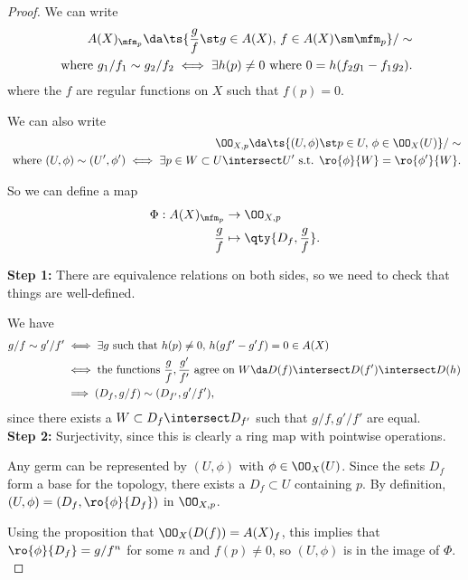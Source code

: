 \begin{proof}

We can write
\begin{align*}  
A(X)_{\mfm_p} \da \ts{{g\over f} \st g\in A(X),\, f\in A(X)\sm \mfm_p} / \sim \\
\text{ where } g_1/f_1 \sim g_2/f_2 \iff \exists h(p) \neq 0 \text{ where }0 = h(f_2 g_1 - f_1 g_2)
.\end{align*} where the \(f\) are regular functions on \(X\) such that
\(f(p) = 0\).

We can also write
\begin{align*}  
\OO_{X, p} \da \ts{(U, \phi) \st p\in U,\, \phi \in \OO_X(U) } /\sim 
\\ \text{ where } (U, \phi) \sim (U', \phi') 
\iff \exists p\in W \subset U\intersect U' \text{ s.t. } \ro{\phi}{W} = \ro{\phi'}{W}
.\end{align*}

So we can define a map
\begin{align*}  
\Phi: A(X)_{\mfm_p} &\to \OO_{X, p} \\
{g\over f} &\mapsto \qty{D_f, {g\over f}}
.\end{align*}

\textbf{Step 1:} There are equivalence relations on both sides, so we
need to check that things are well-defined.

We have
\begin{align*}  
g/f \sim g'/f' &\iff \exists g \text{ such that } h(p) \neq 0,\, h(gf' - g'f)=0 \in A(X) \\
&\iff \text{the functions } {g\over f}, {g' \over f'} \text{ agree on } W\da D(f) \intersect D(f') \intersect D(h) \\
&\implies (D_f, g/f) \sim (D_{f'}, g'/f')
,\end{align*} since there exists a \(W\subset D_f \intersect D_{f'}\)
such that \(g/f, g'/f'\) are equal.\\

\textbf{Step 2:} Surjectivity, since this is clearly a ring map with
pointwise operations.

Any germ can be represented by \((U, \phi)\) with \(\phi \in \OO_X(U)\).
Since the sets \(D_f\) form a base for the topology, there exists a
\(D_f\subset U\) containing \(p\). By definition,
\((U, \phi) = (D_f, \ro{\phi}{D_f})\) in \(\OO_{X, p}\).

Using the proposition that \(\OO_X(D(f)) = A(X)_f\), this implies that
\(\ro{\phi}{D_f} = g/f^n\) for some \(n\) and \(f(p) \neq 0\), so
\((U, \phi)\) is in the image of \(\Phi\).\\


\end{proof}
